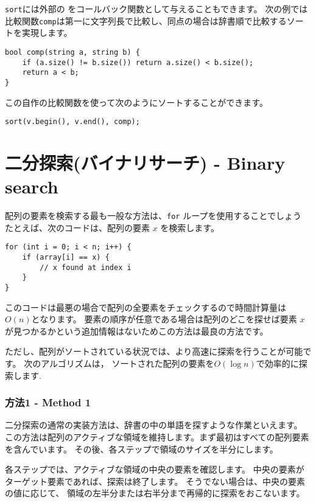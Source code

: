 \texttt{sort}には外部の
をコールバック関数として与えることもできます。
次の例では比較関数\texttt{comp}は第一に文字列長で比較し、同点の場合は辞書順で比較するソートを実現します。

\begin{lstlisting}
bool comp(string a, string b) {
    if (a.size() != b.size()) return a.size() < b.size();
    return a < b;
}
\end{lstlisting}
この自作の比較関数を使って次のようにソートすることができます。
\begin{lstlisting}
sort(v.begin(), v.end(), comp);
\end{lstlisting}

\section{二分探索(バイナリサーチ) - Binary search}


配列の要素を検索する最も一般な方法は、\texttt{for} ループを使用することでしょう
たとえば、次のコードは、配列の要素 $x$ を検索します。

\begin{samepage}
\begin{lstlisting}
for (int i = 0; i < n; i++) {
    if (array[i] == x) {
        // x found at index i
    }
}
\end{lstlisting}
\end{samepage}
このコードは最悪の場合で配列の全要素をチェックするので時間計算量は$O(n)$となります。
要素の順序が任意である場合は配列のどこを探せば要素 $x$ が見つかるかという追加情報はないためこの方法は最良の方法です。

ただし、配列がソートされている状況では、より高速に探索を行うことが可能です。
次のアルゴリズムは，
ソートされた配列の要素を$O(\log n)$で効率的に探索します.

\subsubsection{方法1 - Method 1}

二分探索の通常の実装方法は、辞書の中の単語を探すような作業といえます。
この方法は配列のアクティブな領域を維持します。まず最初はすべての配列要素を含んでいます。
その後、各ステップで領域のサイズを半分にします。

各ステップでは、アクティブな領域の中央の要素を確認します。
中央の要素がターゲット要素であれば、探索は終了します。
そうでない場合は、中央の要素の値に応じて、
領域の左半分または右半分まで再帰的に探索をおこないます。

